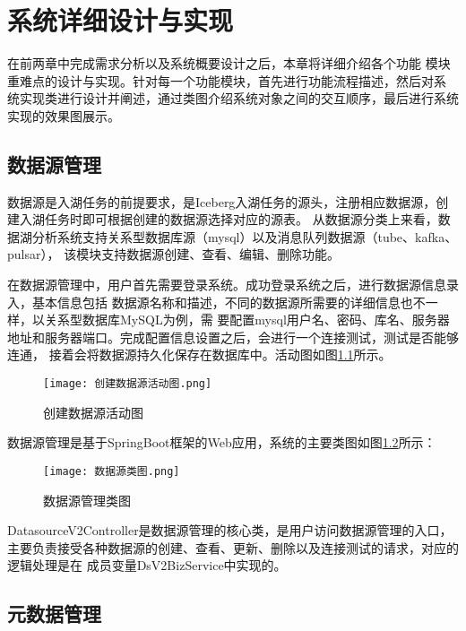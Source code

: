 
\chapter{系统详细设计与实现}

在前两章中完成需求分析以及系统概要设计之后，本章将详细介绍各个功能
模块重难点的设计与实现。针对每一个功能模块，首先进行功能流程描述，然后对系
统实现类进行设计并阐述，通过类图介绍系统对象之间的交互顺序，最后进行系统实现的效果图展示。

\section{数据源管理}

数据源是入湖任务的前提要求，是Iceberg入湖任务的源头，注册相应数据源，创建入湖任务时即可根据创建的数据源选择对应的源表。
从数据源分类上来看，数据湖分析系统支持关系型数据库源（mysql）以及消息队列数据源（tube、kafka、pulsar），
该模块支持数据源创建、查看、编辑、删除功能。

在数据源管理中，用户首先需要登录系统。成功登录系统之后，进行数据源信息录入，基本信息包括
数据源名称和描述，不同的数据源所需要的详细信息也不一样，以关系型数据库MySQL为例，需
要配置mysql用户名、密码、库名、服务器地址和服务器端口。完成配置信息设置之后，会进行一个连接测试，测试是否能够连通，
接着会将数据源持久化保存在数据库中。活动图如图\ref{fig:创建数据源活动图}所示。

\begin{figure}[H]
  \centering
  \texttt{[image: 创建数据源活动图.png]}
  \caption{创建数据源活动图}
  \label{fig:创建数据源活动图}
\end{figure}

数据源管理是基于SpringBoot框架的Web应用，系统的主要类图如图\ref{fig:数据源类图}所示：

\begin{figure}[H]
  \centering
  \texttt{[image: 数据源类图.png]}
  \caption{数据源管理类图}
  \label{fig:数据源类图}
\end{figure}

DatasourceV2Controller是数据源管理的核心类，是用户访问数据源管理的入口，
主要负责接受各种数据源的创建、查看、更新、删除以及连接测试的请求，对应的逻辑处理是在
成员变量DsV2BizService中实现的。

\section{元数据管理}

